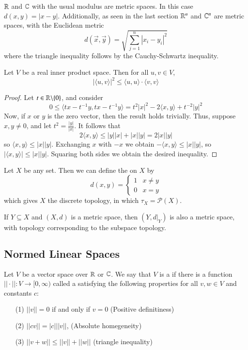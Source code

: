 \begin{eg}
    $\mathbb R$ and $\mathbb C$ with the usual modulus are metric spaces. In this case $d(x,y) = |x-y|$. Additionally, as seen in the last section $\mathbb R^n$ and $\mathbb C^n$ are metric spaces, with the Euclidean metric $$d(\vec{x},\vec{y}) = \sqrt{\sum_{j=1}^n|x_i - y_i|^2}$$ where the triangle inequality follows by the Cauchy-Schwartz inequality.
\end{eg}

\begin{prop}
    Let $V$ be a real inner product space. Then for all $u,v \in V$, $$|\langle u,v\rangle|^2 \leq \langle u,u\rangle \cdot\langle v,v\rangle$$
\end{prop}
\begin{proof}
    Let $t \in \mathbb R\backslash\{0\}$, and consider $$0\leq \langle tx-t^{-1}y,tx-t^{-1}y\rangle = t^2|x|^2 - 2\langle x,y\rangle + t^{-2}|y|^2$$ Now, if $x$ or $y$ is the zero vector, then the result holds trivially. Thus, suppose $x,y\neq 0$, and let $t^2 = \frac{|y|}{|x|}$. It follows that $$2\langle x,y\rangle \leq |y||x| + |x||y| = 2|x||y|$$ so $\langle x,y\rangle \leq |x||y|$. Exchanging $x$ with $-x$ we obtain $-\langle x,y\rangle \leq |x||y|$, so $|\langle x,y\rangle| \leq |x||y|$. Squaring both sides we obtain the desired inequality.
\end{proof}


\begin{eg}
    Let $X$ be any set. Then we can define the  on $X$ by $$d(x,y) = \left\{\begin{array}{cc} 1 & x\neq y\\ 0 & x=y \end{array}\right.$$ which gives $X$ the discrete topology, in which $\tau_X = \mathcal{P}(X)$.
\end{eg}

\begin{eg}
    If $Y \subseteq X$ and $(X,d)$ is a metric space, then $(Y,d\vert_Y)$ is also a metric space, with topology corresponding to the subspace topology.
\end{eg}


\subsection{Normed Linear Spaces}

\begin{defn}
    Let $V$ be a vector space over $\mathbb R$ or $\mathbb C$. We say that $V$ is a  if there is a function $||\cdot||:V\rightarrow [0,\infty)$ called a  satisfying the following properties for all $v,w \in V$ and constants $c$: \begin{itemize}
        \item[(1)] $||v|| = 0$ if and only if $v = 0$ (Positive definitiness)
        \item[(2)] $||cv|| = |c|||v||$, (Absolute homegeneity)
        \item[(3)] $||v+w|| \leq ||v|| + ||w||$ (triangle inequality)
    \end{itemize}
\end{defn}

